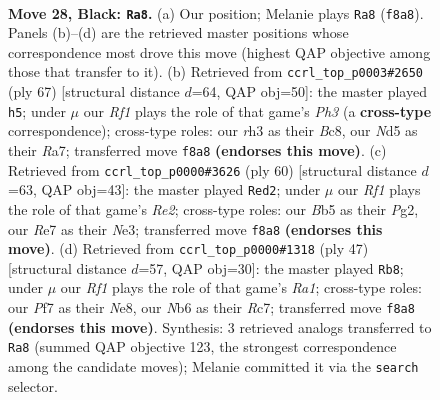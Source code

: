 \documentclass[11pt]{article}
\begin{document}
\clearpage

\begin{figure}[p]\centering
\begin{subfigure}{0.46\textwidth}\centering
\resizebox{\linewidth}{!}{%
\newchessgame
\chessboard[
  setfen={5rk1/4rppp/1n2p3/pbNn2P1/8/1P2P2R/P5PP/RN1B2K1 b - - 6 28},
  showmover=false,
  pgfstyle=straightmove, color=movearrow, markmove={f8-a8}
]}
\caption{}
\end{subfigure}\hfill
\begin{subfigure}{0.46\textwidth}\centering
\resizebox{\linewidth}{!}{%
\newchessgame
\chessboard[
  setfen={r1b5/rp3pk1/2p2npp/3p4/PR1P4/2N1PP1P/2B3PK/4R3 b - - 2 34},
  showmover=false,
  pgfstyle=straightmove, color=movearrow, markmove={h6-h5}
]}
\caption{}
\end{subfigure}
\\[4pt]
\begin{subfigure}{0.46\textwidth}\centering
\resizebox{\linewidth}{!}{%
\newchessgame
\chessboard[
  setfen={8/pr3pk1/1n2p1p1/p1r5/P2R1P1p/2P1N2P/1P2RKP1/8 w - - 2 31},
  showmover=false,
  pgfstyle=straightmove, color=movearrow, markmove={e2-d2}
]}
\caption{}
\end{subfigure}\hfill
\begin{subfigure}{0.46\textwidth}\centering
\resizebox{\linewidth}{!}{%
\newchessgame
\chessboard[
  setfen={r3n1k1/2rp2pp/p1n1p3/4P3/NbP5/5NP1/PB4KP/1R1R4 b - - 6 24},
  showmover=false,
  pgfstyle=straightmove, color=movearrow, markmove={a8-b8}
]}
\caption{}
\end{subfigure}
\caption{\textbf{Move 28, Black: \texttt{Ra8}.} (a) Our position; Melanie plays \texttt{Ra8} (\texttt{f8a8}). Panels (b)--(d) are the retrieved master positions whose correspondence most drove this move (highest QAP objective among those that transfer to it). (b) Retrieved from \texttt{ccrl\_top\_p0003\#2650} (ply 67) [structural distance $d$=64, QAP obj=50]: the master played \texttt{h5}; under $\mu$ our \emph{Rf1} plays the role of that game's \emph{Ph3} (a \textbf{cross-type} correspondence); cross-type roles: our \emph{r}h3 as their \emph{B}c8, our \emph{N}d5 as their \emph{R}a7; transferred move \texttt{f8a8} \textbf{(endorses this move)}. (c) Retrieved from \texttt{ccrl\_top\_p0000\#3626} (ply 60) [structural distance $d$=63, QAP obj=43]: the master played \texttt{Red2}; under $\mu$ our \emph{Rf1} plays the role of that game's \emph{Re2}; cross-type roles: our \emph{B}b5 as their \emph{P}g2, our \emph{R}e7 as their \emph{N}e3; transferred move \texttt{f8a8} \textbf{(endorses this move)}. (d) Retrieved from \texttt{ccrl\_top\_p0000\#1318} (ply 47) [structural distance $d$=57, QAP obj=30]: the master played \texttt{Rb8}; under $\mu$ our \emph{Rf1} plays the role of that game's \emph{Ra1}; cross-type roles: our \emph{P}f7 as their \emph{N}e8, our \emph{N}b6 as their \emph{R}c7; transferred move \texttt{f8a8} \textbf{(endorses this move)}. Synthesis: 3 retrieved analogs transferred to \texttt{Ra8} (summed QAP objective 123, the strongest correspondence among the candidate moves); Melanie committed it via the \texttt{search} selector.}
\label{fig:thought-m55}
\end{figure}
\end{document}

